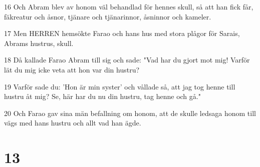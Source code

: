 \par 16 Och Abram blev av honom väl behandlad för hennes skull, så att han fick får, fäkreatur och åsnor, tjänare och tjänarinnor, åsninnor och kameler.
\par 17 Men HERREN hemsökte Farao och hans hus med stora plågor för Sarais, Abrams hustrus, skull.
\par 18 Då kallade Farao Abram till sig och sade: "Vad har du gjort mot mig! Varför lät du mig icke veta att hon var din hustru?
\par 19 Varför sade du: 'Hon är min syster' och vållade så, att jag tog henne till hustru åt mig? Se, här har du nu din hustru, tag henne och gå."
\par 20 Och Farao gav sina män befallning om honom, att de skulle ledsaga honom till vägs med hans hustru och allt vad han ägde.

\chapter{13}


